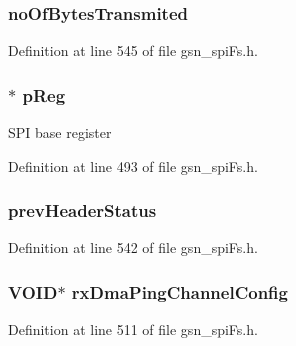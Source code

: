 \hypertarget{a00232_acf2761ea7cf5dbf36810885481f39bfd}{
\subsubsection[{noOfBytesTransmited}]{ {\bf noOfBytesTransmited}}}
\label{a00232_acf2761ea7cf5dbf36810885481f39bfd}


Definition at line 545 of file gsn\_\-spiFs.h.

\hypertarget{a00232_a8843236297383a79c5da2bbddfcee223}{
\subsubsection[{pReg}]{$\ast$ {\bf pReg}}}
\label{a00232_a8843236297383a79c5da2bbddfcee223}
SPI base register 

Definition at line 493 of file gsn\_\-spiFs.h.

\hypertarget{a00232_ab326bd4b1bbe3f68147d5136e2bf70ed}{
\subsubsection[{prevHeaderStatus}]{ {\bf prevHeaderStatus}}}
\label{a00232_ab326bd4b1bbe3f68147d5136e2bf70ed}


Definition at line 542 of file gsn\_\-spiFs.h.

\hypertarget{a00232_ab10b1874804481103b375718a1788144}{
\subsubsection[{rxDmaPingChannelConfig}]{\setlength{\rightskip}{0pt plus 5cm}VOID$\ast$ {\bf rxDmaPingChannelConfig}}}
\label{a00232_ab10b1874804481103b375718a1788144}


Definition at line 511 of file gsn\_\-spiFs.h.

